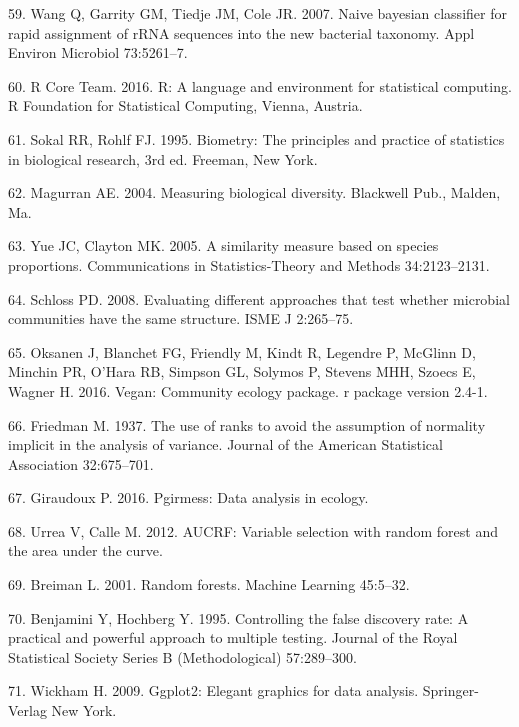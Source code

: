 \documentclass[12pt,]{article}
\begin{document}
\hypertarget{ref-wang_taxonomy_2007}{}
59. Wang Q, Garrity GM, Tiedje JM, Cole JR. 2007. Naive bayesian
classifier for rapid assignment of rRNA sequences into the new bacterial
taxonomy. Appl Environ Microbiol 73:5261--7.

\hypertarget{ref-R}{}
60. R Core Team. 2016. R: A language and environment for statistical
computing. R Foundation for Statistical Computing, Vienna, Austria.

\hypertarget{ref-sokal_biometrystats_1995}{}
61. Sokal RR, Rohlf FJ. 1995. Biometry: The principles and practice of
statistics in biological research, 3rd ed. Freeman, New York.

\hypertarget{ref-magurran_measuring_2004}{}
62. Magurran AE. 2004. Measuring biological diversity. Blackwell Pub.,
Malden, Ma.

\hypertarget{ref-yue_thetaYC_2005}{}
63. Yue JC, Clayton MK. 2005. A similarity measure based on species
proportions. Communications in Statistics-Theory and Methods
34:2123--2131.

\hypertarget{ref-schloss_commstruct_2008}{}
64. Schloss PD. 2008. Evaluating different approaches that test whether
microbial communities have the same structure. ISME J 2:265--75.

\hypertarget{ref-oksanen_vegan_2016}{}
65. Oksanen J, Blanchet FG, Friendly M, Kindt R, Legendre P, McGlinn D,
Minchin PR, O'Hara RB, Simpson GL, Solymos P, Stevens MHH, Szoecs E,
Wagner H. 2016. Vegan: Community ecology package. r package version
2.4-1.

\hypertarget{ref-friedman_1937}{}
66. Friedman M. 1937. The use of ranks to avoid the assumption of
normality implicit in the analysis of variance. Journal of the American
Statistical Association 32:675--701.

\hypertarget{ref-pgirmess}{}
67. Giraudoux P. 2016. Pgirmess: Data analysis in ecology.

\hypertarget{ref-AUCRF}{}
68. Urrea V, Calle M. 2012. AUCRF: Variable selection with random forest
and the area under the curve.

\hypertarget{ref-breiman_rf_2001}{}
69. Breiman L. 2001. Random forests. Machine Learning 45:5--32.

\hypertarget{ref-Benjamini_Hochberg_1995}{}
70. Benjamini Y, Hochberg Y. 1995. Controlling the false discovery rate:
A practical and powerful approach to multiple testing. Journal of the
Royal Statistical Society Series B (Methodological) 57:289--300.

\hypertarget{ref-ggplot2}{}
71. Wickham H. 2009. Ggplot2: Elegant graphics for data analysis.
Springer-Verlag New York.
\end{document}
